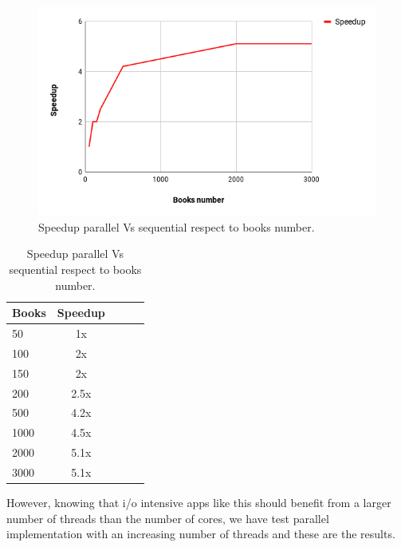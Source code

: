 \documentclass[10pt,twocolumn,letterpaper]{article}
\begin{document}
\begin{figure}[H]
\begin{center}
\includegraphics[width=\columnwidth]{template/latex/speedup.png}
\caption{Speedup parallel Vs sequential respect to books number.}
\label{fig:short}
\end{center}
\end{figure}

\begin{table}[H]
\begin{center}
\begin{tabular}{|l|c|c|c|c|}
\hline
Books & Speedup\\
\hline\hline
50 & 1x\\
100 & 2x\\
150 & 2x\\
200 & 2.5x\\
500 & 4.2x\\
1000 & 4.5x\\
2000 & 5.1x\\
3000 & 5.1x\\
\hline
\end{tabular}
\end{center}
\caption{Speedup parallel Vs sequential respect to books number.}
\end{table}

However, knowing that i/o intensive apps like this should benefit from a larger number of threads than the number of cores, we have test parallel implementation  with an increasing number of threads and these are the results.
\end{document}
